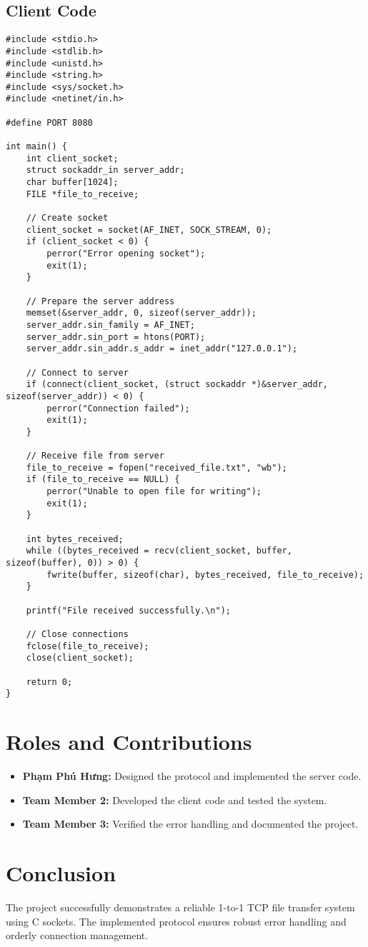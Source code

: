 \documentclass[a4paper,12pt]{article}
\begin{document}
\subsection*{Client Code}
\begin{verbatim}
#include <stdio.h>
#include <stdlib.h>
#include <unistd.h>
#include <string.h>
#include <sys/socket.h>
#include <netinet/in.h>

#define PORT 8080

int main() {
    int client_socket;
    struct sockaddr_in server_addr;
    char buffer[1024];
    FILE *file_to_receive;

    // Create socket
    client_socket = socket(AF_INET, SOCK_STREAM, 0);
    if (client_socket < 0) {
        perror("Error opening socket");
        exit(1);
    }

    // Prepare the server address
    memset(&server_addr, 0, sizeof(server_addr));
    server_addr.sin_family = AF_INET;
    server_addr.sin_port = htons(PORT);
    server_addr.sin_addr.s_addr = inet_addr("127.0.0.1");

    // Connect to server
    if (connect(client_socket, (struct sockaddr *)&server_addr, sizeof(server_addr)) < 0) {
        perror("Connection failed");
        exit(1);
    }

    // Receive file from server
    file_to_receive = fopen("received_file.txt", "wb");
    if (file_to_receive == NULL) {
        perror("Unable to open file for writing");
        exit(1);
    }

    int bytes_received;
    while ((bytes_received = recv(client_socket, buffer, sizeof(buffer), 0)) > 0) {
        fwrite(buffer, sizeof(char), bytes_received, file_to_receive);
    }

    printf("File received successfully.\n");

    // Close connections
    fclose(file_to_receive);
    close(client_socket);

    return 0;
}
\end{verbatim}

\section*{Roles and Contributions}
\begin{itemize}
    \item \textbf{Phạm Phú Hưng:} Designed the protocol and implemented the server code.
    \item \textbf{Team Member 2:} Developed the client code and tested the system.
    \item \textbf{Team Member 3:} Verified the error handling and documented the project.
\end{itemize}

\section*{Conclusion}
The project successfully demonstrates a reliable 1-to-1 TCP file transfer system using C sockets. The implemented protocol ensures robust error handling and orderly connection management.
\end{document}
